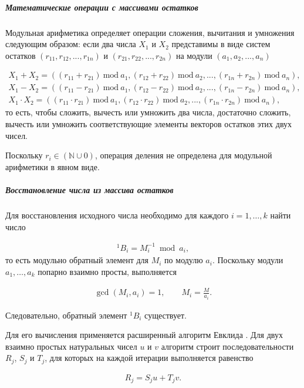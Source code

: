 \documentclass{crm-article}
\begin{document}
\subparagraph{Математические операции с массивами остатков}

Модульная арифметика \cite{omondi2007residue, soderstrand1986residue} определяет операции сложения, вычитания и умножения следующим образом: если два числа $X_1$ и $X_2$ представимы в виде систем остатков $(r_{11}, r_{12}, ..., r_{1n}) $ и $(r_{21}, r_{22}, ..., r_{2n})$ на модули $(a_1, a_2, ..., a_n)$

\begin{align} 
	X_1 + X_2  = ((r_{11} + r_{21})\ \mathrm{mod}\ a_1, (r_{12} + r_{22})\ \mathrm{mod}\ a_2, ..., (r_{1n} + r_{2n})\ \mathrm{mod}\ a_n), \\
	X_1 - X_2 = ((r_{11} - r_{21})\ \mathrm{mod}\ a_1, (r_{12} - r_{22})\ \mathrm{mod}\ a_2, ..., (r_{1n} - r_{2n})\ \mathrm{mod}\ a_n), \\
	X_1 \cdot X_2 = ((r_{11} \cdot r_{21})\ \mathrm{mod}\ a_1, (r_{12} \cdot r_{22})\ \mathrm{mod}\ a_2, ..., (r_{1n} \cdot r_{2n})\ \mathrm{mod}\ a_n), 
\end{align}
то есть, чтобы сложить, вычесть или умножить два числа, достаточно сложить, вычесть или умножить соответствующие элементы векторов остатков этих двух чисел.

Поскольку $r_i \in (\mathbb{N} \cup 0)$, операция деления не определена для модульной арифметики в явном виде.

\subparagraph{Восстановление числа из массива остатков}

Для восстановления исходного числа необходимо для каждого $i=1,\ldots,k$ найти число

\begin{gather}
    ^1B_i=M_i^{-1}\bmod a_i,
\end{gather}
то есть модульно обратный элемент для $M_i$ по модулю $a_i$. Поскольку модули $a_1,\ldots,a_k$ попарно взаимно просты, выполняется

\begin{gather}
    \gcd(M_i,a_i)=1,
    \qquad
    M_i=\frac{M}{a_i}.
\end{gather}

Следовательно, обратный элемент $^1B_i$ существует.

Для его вычисления применяется расширенный алгоритм Евклида \cite{Okulov2011}. Для двух взаимно простых натуральных чисел $u$ и $v$ алгоритм строит последовательности $R_j$, $S_j$ и $T_j$, для которых на каждой итерации выполняется равенство

\begin{gather}
    R_j=S_j u+T_j v.
\end{gather}
\end{document}
